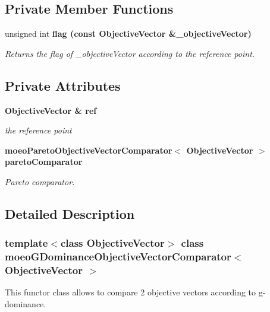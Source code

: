 \subsection*{Private Member Functions}
\begin{CompactItemize}
\item 
unsigned int \bf{flag} (const \bf{Objective\-Vector} \&\_\-objective\-Vector)
\begin{CompactList}\small\item\em Returns the flag of \_\-objective\-Vector according to the reference point. \item\end{CompactList}\end{CompactItemize}
\subsection*{Private Attributes}
\begin{CompactItemize}
\item 
\bf{Objective\-Vector} \& \bf{ref}\label{classmoeoGDominanceObjectiveVectorComparator_54cf089933c4d5d70ceb931c2b97ca68}

\begin{CompactList}\small\item\em the reference point \item\end{CompactList}\item 
\bf{moeo\-Pareto\-Objective\-Vector\-Comparator}$<$ \bf{Objective\-Vector} $>$ \bf{pareto\-Comparator}\label{classmoeoGDominanceObjectiveVectorComparator_5768e6444e546f1da2f36ccabcfc1f70}

\begin{CompactList}\small\item\em Pareto comparator. \item\end{CompactList}\end{CompactItemize}


\subsection{Detailed Description}
\subsubsection*{template$<$class Objective\-Vector$>$ class moeo\-GDominance\-Objective\-Vector\-Comparator$<$ Objective\-Vector $>$}

This functor class allows to compare 2 objective vectors according to g-dominance. 

